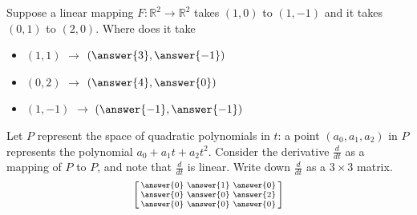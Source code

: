 \documentclass{ximera}
\begin{document}
\begin{exercise}%
    Suppose a linear mapping $F \colon {\mathbb R}^2 \to {\mathbb R}^2$ takes $(1,0)$ to $(1,-1)$ and it takes $(0,1)$ to $(2,0)$. Where does it take
    \begin{itemize}
        \item $(1,1)$ $\rightarrow$ $\left( \answer{3}, \answer{-1} \right)$
        \item $(0,2)$ $\rightarrow$ $\left( \answer{4}, \answer{0} \right)$
        \item $(1,-1)$ $\rightarrow$ $\left( \answer{-1}, \answer{-1} \right)$
    \end{itemize}
\end{exercise}

\begin{exercise}%
    Let $P$ represent the space of quadratic polynomials  in $t$: a point $(a_0,a_1,a_2)$ in $P$ represents the polynomial $a_0 + a_1 t + a_2 t^2$. Consider the derivative $\frac{d}{dt}$ as a mapping of $P$ to  $P$, and note that $\frac{d}{dt}$ is linear.  Write down $\frac{d}{dt}$ as a $3 \times 3$ matrix.
    \[
        \left[\begin{smallmatrix} \answer{0} & \answer{1} & \answer{0} \\ \answer{0} & \answer{0} & \answer{2} \\ \answer{0} & \answer{0} & \answer{0} \end{smallmatrix}\right]
    \]
\end{exercise}
%
\end{document}
